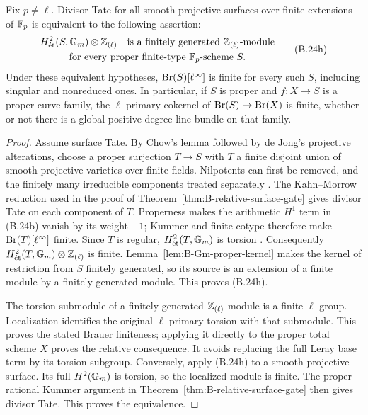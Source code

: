 \begin{proposition}
\label{prop:B-singular-proper-Brauer-gate}
Fix \(p\ne\ell\).  Divisor Tate for all smooth projective
surfaces over finite extensions of \(\mathbb F_p\) is equivalent to
the following assertion:
\[
 \begin{gathered}
 H^2_{\mathrm{\acute et}}(S,{\mathbb G_m})\otimes\mathbb Z_{(\ell)}
 \quad\hbox{is a finitely generated }\mathbb Z_{(\ell)}\hbox{-module}\\
 \hbox{for every proper finite-type }\mathbb F_p\hbox{-scheme }S.
 \end{gathered}
                                                               \tag{B.24h}
\]
Under these equivalent hypotheses, \(\operatorname{Br}(S)[\ell^\infty]\)
is finite for every such \(S\), including singular and
nonreduced ones.  In particular, if \(S\) is proper and
\(f:X\to S\) is a proper curve family, the \(\ell\)-primary
cokernel of \(\operatorname{Br}(S)\to\operatorname{Br}(X)\) is finite, whether or not
there is a global positive-degree line bundle on that family.
\end{proposition}
\begin{proof}
Assume surface Tate.  By Chow's lemma followed by de Jong's
projective alterations, choose a proper surjection \(T\to S\)
with \(T\) a finite disjoint union of smooth projective
varieties over finite fields.  Nilpotents can first be removed,
and the finitely many irreducible components treated separately
\cite[Theorem~4.1 and Remark~4.2]{c_dejong1996}.
The Kahn--Morrow reduction used in the proof of
Theorem~\ref{thm:B-relative-surface-gate} gives divisor Tate
on each component of \(T\).  Properness makes the arithmetic
\(H^1\) term in (B.24b) vanish by its weight \(-1\);
Kummer and finite cotype therefore make
\(\operatorname{Br}(T)[\ell^\infty]\) finite.  Since \(T\) is regular,
\(H^2_{\mathrm{\acute et}}(T,{\mathbb G_m})\) is torsion
\cite[Proposition~1.4 and Corollary~1.8]{BGrothendieckBrauerII1966}.
Consequently
\(H^2_{\mathrm{\acute et}}(T,{\mathbb G_m})\otimes\mathbb Z_{(\ell)}\) is finite.
Lemma~\ref{lem:B-Gm-proper-kernel} makes the kernel of
restriction from \(S\) finitely generated, so its source is
an extension of a finite module by a finitely generated module.
This proves (B.24h).

The torsion submodule of a finitely generated
\(\mathbb Z_{(\ell)}\)-module is a finite \(\ell\)-group.
Localization identifies the original \(\ell\)-primary
torsion with that submodule.  This proves the stated Brauer
finiteness; applying it directly to the proper total scheme
\(X\) proves the relative consequence.  It avoids replacing
the full Leray base term by its torsion subgroup.
Conversely, apply (B.24h) to a smooth projective surface.
Its full \(H^2({\mathbb G_m})\) is torsion, so the localized
module is finite.  The proper rational Kummer argument in
Theorem~\ref{thm:B-relative-surface-gate} then gives divisor
Tate.  This proves the equivalence.
\end{proof}

